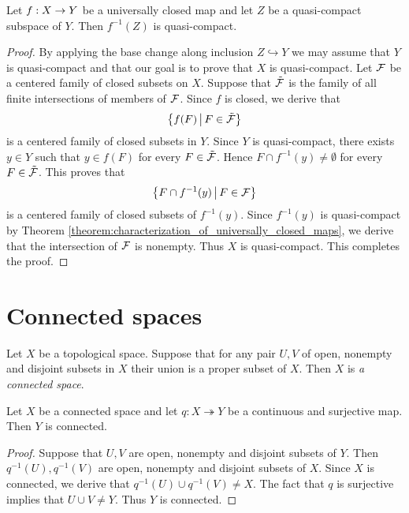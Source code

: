 \begin{proposition}\label{proposition:quasi_compactness_is_preserved_by_preimage_of_universally_closed_maps}
	Let $f:X\rightarrow Y$ be a universally closed map and let $Z$ be a quasi-compact subspace of $Y$. Then $f^{-1}(Z)$ is quasi-compact.
\end{proposition}
\begin{proof}
	By applying the base change along inclusion $Z \hookrightarrow Y$ we may assume that $Y$ is quasi-compact and that our goal is to prove that $X$ is quasi-compact. Let ${\mathcal F}$ be a centered family of closed subsets on $X$. Suppose that $\tilde{{\mathcal F}}$ is the family of all finite intersections of members of ${\mathcal F}$. Since $f$ is closed, we derive that
	$$\big\{f(F)\,\big|\,F\in \tilde{{\mathcal F}}\big\}$$
	is a centered family of closed subsets in $Y$. Since $Y$ is quasi-compact, there exists $y \in Y$ such that $y \in f(F)$ for every $F \in \tilde{{\mathcal F}}$. Hence $F\cap f^{-1}(y) \neq \emptyset$ for every $F \in \tilde{{\mathcal F}}$. This proves that
	$$\big\{F\cap f^{-1}(y)\,\big|\,F\in {\mathcal F}\big\}$$
	is a centered family of closed subsets of $f^{-1}(y)$. Since $f^{-1}(y)$ is quasi-compact by Theorem \ref{theorem:characterization_of_universally_closed_maps}, we derive that the intersection of ${\mathcal F}$ is nonempty. Thus $X$ is quasi-compact. This completes the proof.
\end{proof}

\section{Connected spaces}

\begin{definition}
	Let $X$ be a topological space. Suppose that for any pair $U, V$ of open, nonempty and disjoint subsets in $X$ their union is a proper subset of $X$. Then $X$ is \textit{a connected space}.
\end{definition}

\begin{proposition}\label{proposition:connected_spaces_are_preserved_under_continuous_images}
	Let $X$ be a connected space and let $q:X\twoheadrightarrow Y$ be a continuous and surjective map. Then $Y$ is connected.
\end{proposition}
\begin{proof}
	Suppose that $U,V$ are open, nonempty and disjoint subsets of $Y$. Then $q^{-1}(U),q^{-1}(V)$ are open, nonempty and disjoint subsets of $X$. Since $X$ is connected, we derive that $q^{-1}(U) \cup q^{-1}(V) \neq X$. The fact that $q$ is surjective implies that $U \cup V \neq Y$. Thus $Y$ is connected.
\end{proof}


